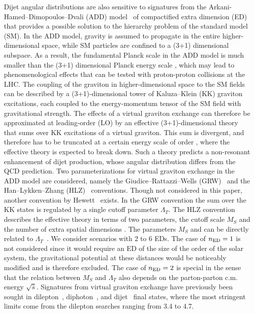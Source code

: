 \documentclass[11pt,twoside,a4paper,cmspaper,final,collab]{cms-tdr}
\begin{document}
Dijet angular distributions are also sensitive to signatures from the
Arkani-Hamed--Dimopoulos--Dvali (ADD)
model~\cite{ArkaniHamed:1998nn,ArkaniHamed:1998rs}
of compactified extra dimension (ED) that provides a possible
solution to the hierarchy problem of the standard model (SM).
In the ADD model,
gravity is assumed to propagate in the entire higher-dimensional
space, while SM particles are confined to a (3+1) dimensional subspace.
As a result, the fundamental Planck scale \MD in the ADD model is
much smaller than the (3+1) dimensional Planck energy scale \Mpl,
which may lead to phenomenological effects that can be tested with
proton-proton collisions at the LHC.
The coupling of the graviton in higher-dimensional space to the SM
fields can be described by a (3+1)-dimensional tower of Kaluza--Klein
(KK) graviton excitations, each coupled to the energy-momentum tensor
of the SM field with gravitational strength. The effects of a
virtual graviton exchange can therefore be approximated at leading-order (LO) by an
effective (3+1)-dimensional theory that sums over KK excitations of a
virtual graviton. This sum is divergent, and therefore has to be
truncated at a certain energy scale of order \MD, where the effective theory is expected to break down.
Such a theory predicts a non-resonant enhancement of dijet production, whose angular
distribution differs from the QCD prediction.  Two parameterizations for
virtual graviton exchange in the ADD model are considered, namely the
Giudice--Rattazzi--Wells (GRW)~\cite{GRW} and the Han--Lykken--Zhang
(HLZ)~\cite{HLZ} conventions. Though not considered in this paper,
another convention by Hewett~\cite{Hewett} exists.
In the GRW convention the sum over the KK states is regulated by a
single cutoff parameter $\Lambda_T$. The HLZ convention describes the effective
theory in terms of two parameters, the cutoff scale $M_S$ and the number
of extra spatial dimensions \nED.
The parameters $M_{S}$ and \nED can be directly related to
$\Lambda_{T}$~\cite{landsberg}.  We consider scenarios with 2 to 6
EDs.
The case of $n_\mathrm{ED}=1$ is not considered since it would require an
ED of the size of the order of the solar system, the gravitational potential
at these distances would be noticeably modified and is therefore excluded.
The case of $n_\mathrm{ED}=2$ is special in
the sense that the relation between $M_{S}$ and $\Lambda_{T}$ also
depends on the parton-parton c.m. energy $\sqrt{\hat{s}}$.
Signatures from virtual graviton exchange have previously been sought in
dilepton~\cite{CMS-PAPERS-EXO-11-087,newATLASdilepton},
diphoton~\cite{CMS-PAPERS-EXO-11-038,Aad:2012cy}, and
dijet~\cite{Abazov:2009mh,ATLASdijet,Franceschini:2011wr} final states, where the
most stringent limits come from the dilepton searches ranging from 3.4
to 4.7\TeV.
\end{document}
